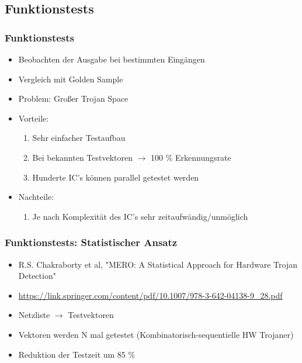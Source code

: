 \documentclass[11pt]{beamer}
\begin{document}
\subsection{Funktionstests}
\begin{frame}
    \frametitle{Funktionstests}
    \begin{itemize}
        \item Beobachten der Ausgabe bei bestimmten Eingängen
        \item Vergleich mit Golden Sample
        \item Problem: Großer Trojan Space
        \item Vorteile:
        \begin{enumerate}
            \item Sehr einfacher Testaufbau
            \item Bei bekannten Testvektoren $\rightarrow$ 100 \% Erkennungsrate
            \item Hunderte IC's können parallel getestet werden
        \end{enumerate}
        \item Nachteile:
        \begin{enumerate}
            \item Je nach Komplexität des IC's sehr zeitaufwändig/unmöglich
        \end{enumerate}
    \end{itemize}
\end{frame}
\begin{frame}
    \frametitle{Funktionstests: Statistischer Ansatz}
    \begin{itemize}
        \item R.S. Chakraborty et al, "MERO: A Statistical Approach for Hardware Trojan Detection"
        \item \url{https://link.springer.com/content/pdf/10.1007/978-3-642-04138-9_28.pdf}
        \item Netzliste $\rightarrow$ Testvektoren
        \item Vektoren werden N mal getestet (Kombinatorisch-sequentielle HW Trojaner)
        \item Reduktion der Testzeit um 85 \%
    \end{itemize}
\end{frame}
\end{document}
